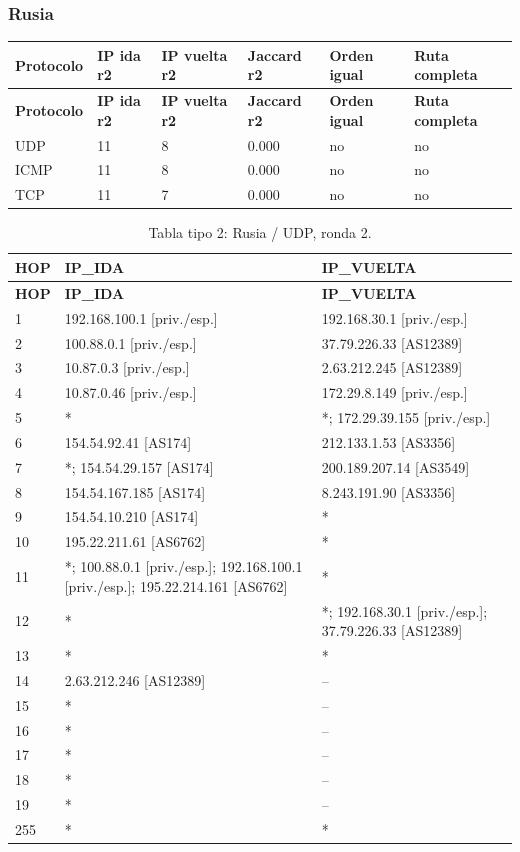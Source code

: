 \subsubsection{Rusia}
\begingroup
\fontsize{9}{11}\selectfont
\addtocounter{table}{-1}
\begin{longtable}{p{2.1cm}p{1.7cm}p{2cm}p{2cm}p{2.2cm}p{2.7cm}}
\toprule
\textbf{Protocolo} & \textbf{IP ida r2} & \textbf{IP vuelta r2} & \textbf{Jaccard r2} & \textbf{Orden igual} & \textbf{Ruta completa} \\ \midrule
\endfirsthead
\toprule
\textbf{Protocolo} & \textbf{IP ida r2} & \textbf{IP vuelta r2} & \textbf{Jaccard r2} & \textbf{Orden igual} & \textbf{Ruta completa} \\ \midrule
\endhead
UDP & 11 & 8 & 0.000 & no & no \\
ICMP & 11 & 8 & 0.000 & no & no \\
TCP & 11 & 7 & 0.000 & no & no \\
\bottomrule
\end{longtable}
\endgroup
\begingroup
\fontsize{9}{11}\selectfont
\begin{longtable}{p{0.95cm}p{7.075cm}p{7.075cm}}
\caption{Tabla tipo 2: Rusia / UDP, ronda 2.}\label{tabla2:37.79.226.46:UDP} \\
\toprule
\textbf{HOP} & \textbf{IP\_\allowbreak{}IDA} & \textbf{IP\_\allowbreak{}VUELTA} \\ \midrule
\endfirsthead
\toprule
\textbf{HOP} & \textbf{IP\_\allowbreak{}IDA} & \textbf{IP\_\allowbreak{}VUELTA} \\ \midrule
\endhead
1 & 192.168.100.1 [priv./esp.] & 192.168.30.1 [priv./esp.] \\
2 & 100.88.0.1 [priv./esp.] & 37.79.226.33 [AS12389] \\
3 & 10.87.0.3 [priv./esp.] & 2.63.212.245 [AS12389] \\
4 & 10.87.0.46 [priv./esp.] & 172.29.8.149 [priv./esp.] \\
5 & * & *; 172.29.39.155 [priv./esp.] \\
6 & 154.54.92.41 [AS174] & 212.133.1.53 [AS3356] \\
7 & *; 154.54.29.157 [AS174] & 200.189.207.14 [AS3549] \\
8 & 154.54.167.185 [AS174] & 8.243.191.90 [AS3356] \\
9 & 154.54.10.210 [AS174] & * \\
10 & 195.22.211.61 [AS6762] & * \\
11 & *; 100.88.0.1 [priv./esp.]; 192.168.100.1 [priv./esp.]; 195.22.214.161 [AS6762] & * \\
12 & * & *; 192.168.30.1 [priv./esp.]; 37.79.226.33 [AS12389] \\
13 & * & * \\
14 & 2.63.212.246 [AS12389] & -- \\
15 & * & -- \\
16 & * & -- \\
17 & * & -- \\
18 & * & -- \\
19 & * & -- \\
255 & * & * \\
\bottomrule
\end{longtable}
